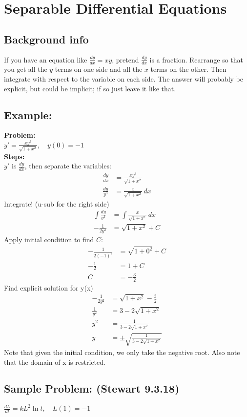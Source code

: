 \documentclass{article}
\begin{document}
\hypertarget{separableSolve}{
  \section*{Separable Differential Equations}
  \subsection*{Background info} 
  If you have an equation like $\frac{dy}{dx} = xy$, pretend $\frac{dy}{dx}$ is a fraction. Rearrange so that you get all the $y$ terms on one side and all the $x$ terms on the other. Then integrate with respect to the variable on each side. The answer will probably be explicit, but could be implicit; if so just leave it like that.
  \subsection*{Example:}
  \noindent \textbf{Problem:} \\[6pt]
  $y' = \frac{xy^3}{\sqrt{1+x^2}}, \quad y(0) = -1$ \\[6pt]
  \textbf{Steps:}\\[6pt]
  $y'$ is $\frac{dy}{dx}$, then separate the variables:
	\begin{align*}
	\frac{dy}{dx} &= \frac{xy^3}{\sqrt{1+x^2}} \\
	\frac{dy}{y^3} &= \frac{x}{\sqrt{1+x^2}} \, dx 
	\end{align*}
	Integrate! (u-sub for the right side)
	\begin{align*}
	\int \frac{dy}{y^3} &= \int \frac{x}{\sqrt{1+x^2}} \, dx \\
	-\frac{1}{2y^2} &= \sqrt{1+x^2} + C 
	\end{align*}
	Apply initial condition to find $C$:
	\begin{align*}
	-\frac{1}{2(-1)^2} &= \sqrt{1+0^2} + C \\
	-\frac{1}{2} &= 1 + C \\
	C &= -\frac{3}{2}
	\end{align*}
	Find explicit solution for y(x)
	\begin{align*}
	-\frac{1}{2y^2} &= \sqrt{1+x^2} - \frac{3}{2} \\
	\frac{1}{y^2} &= 3 - 2\sqrt{1+x^2} \\
	y^2 &= \frac{1}{3 - 2\sqrt{1+x^2}} \\
	y &= \pm \sqrt{\frac{1}{3 - 2\sqrt{1+x^2}}}
	\end{align*}
	Note that given the initial condition, we only take the negative root. Also note that the domain of x is restricted.
  \subsection*{Sample Problem: (Stewart 9.3.18)}
  $\frac{dL}{dt} = kL^2 \ln t, \quad L(1) = -1$ 
}
\end{document}

